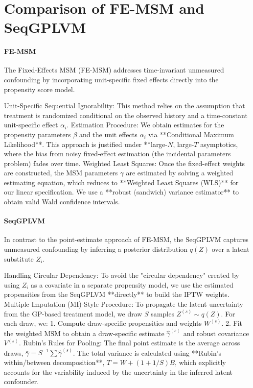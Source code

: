 \section{Comparison of FE-MSM and SeqGPLVM}
\label{sec:comparison}
\paragraph{FE-MSM}
The Fixed-Effects MSM (FE-MSM) addresses time-invariant unmeasured confounding by incorporating unit-specific fixed effects directly into the propensity score model.

Unit-Specific Sequential Ignorability: This method relies on the assumption that treatment is randomized conditional on the observed history and a time-constant unit-specific effect $\alpha_i$.
Estimation Procedure: We obtain estimates for the propensity parameters $\beta$ and the unit effects $\alpha_i$ via **Conditional Maximum Likelihood**. This approach is justified under **large-$N$, large-$T$ asymptotics, where the bias from noisy fixed-effect estimation (the incidental parameters problem) fades over time.
Weighted Least Squares: Once the fixed-effect weights are constructed, the MSM parameters $\gamma$ are estimated by solving a weighted estimating equation, which reduces to **Weighted Least Squares (WLS)** for our linear specification. We use a **robust (sandwich) variance estimator** to obtain valid Wald confidence intervals.

\paragraph{SeqGPLVM}

In contrast to the point-estimate approach of FE-MSM, the SeqGPLVM captures unmeasured confounding by inferring a posterior distribution $q(Z)$ over a latent substitute $Z_i$.

Handling Circular Dependency: To avoid the "circular dependency" created by using $Z_i$ as a covariate in a separate propensity model, we use the estimated propensities from the SeqGPLVM **directly** to build the IPTW weights.
Multiple Imputation (MI)-Style Procedure: To propagate the latent uncertainty from the GP-based treatment model, we draw $S$ samples $Z^{(s)} \sim q(Z)$. For each draw, we:
    1.  Compute draw-specific propensities and weights $W^{(s)}$.
    2.  Fit the weighted MSM to obtain a draw-specific estimate $\hat{\gamma}^{(s)}$ and robust covariance $V^{(s)}$.
Rubin’s Rules for Pooling: The final point estimate is the average across draws, $\bar{\gamma} = S^{-1}\sum \hat{\gamma}^{(s)}$. The total variance is calculated using **Rubin’s within/between decomposition**, $T = W + (1 + 1/S)B$, which explicitly accounts for the variability induced by the uncertainty in the inferred latent confounder.



